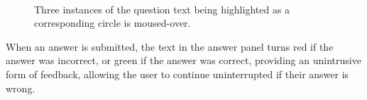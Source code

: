 \documentclass[12pt,twoside,notitlepage,xetex]{report}
\begin{document}
{\begin{center}
\begin{figure}[H]
\begin{center}
\\
\vspace{0.5cm}
\end{center}
\caption{Three instances of the question text being highlighted as a corresponding circle is moused-over.}
\label{fig:Highlighting}
\end{figure}
\end{center}

When an answer is submitted, the text in the answer panel turns red if the answer was incorrect, or green if the answer was correct, providing an unintrusive form of feedback, allowing the user to continue uninterrupted if their answer is wrong.

}
\end{document}
